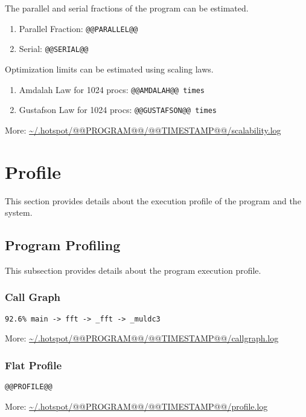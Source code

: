 \documentclass[a4paper]{article}
\begin{document}
The parallel and serial fractions of the program can be estimated.

\begin{enumerate}
\item Parallel Fraction: {\tt @@PARALLEL@@}
\item Serial: {\tt @@SERIAL@@}
\end{enumerate}

Optimization limits can be estimated using scaling laws.

\begin{enumerate}
\item Amdalah Law for 1024 procs: {\tt @@AMDALAH@@ times}
\item Gustafson Law for 1024 procs: {\tt @@GUSTAFSON@@ times}
\end{enumerate}

More: \url{~/.hotspot/@@PROGRAM@@/@@TIMESTAMP@@/scalability.log}

\section{Profile}

This section provides details about the execution profile of the program and the system.

\subsection{Program Profiling}

This subsection provides details about the program execution profile.

\subsubsection{Call Graph}

\begin{verbatim}
92.6% main -> fft -> _fft -> _muldc3
\end{verbatim}

More: \url{~/.hotspot/@@PROGRAM@@/@@TIMESTAMP@@/callgraph.log}

\subsubsection{Flat Profile}

\begin{verbatim}
@@PROFILE@@
\end{verbatim}

More: \url{~/.hotspot/@@PROGRAM@@/@@TIMESTAMP@@/profile.log}
\end{document}
